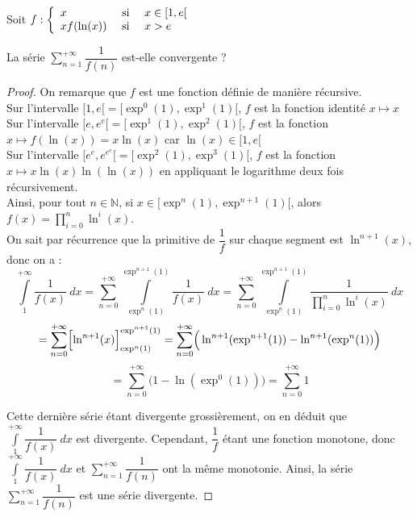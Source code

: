 \begin{exercice}
Soit $f : 
\left\{
\begin{array}{l l l}
x &\text{ si } &x \in [ 1, e [\\
x f(\ln(x)) &\text{ si }& x > e\\
\end{array} 
\right.$

La série $\displaystyle\sum\limits_{n = 1}^{+\infty} \dfrac{1}{f(n)}$ est-elle convergente ?
\end{exercice}

\begin{proof}
On remarque que $f$ est une fonction définie de manière récursive. \\
Sur l'intervalle $[ 1, e [ = [\exp^{0}(1), \exp^{1}(1)[$, $f$ est la fonction identité $x \longmapsto x$\\
Sur l'intervalle $[ e, e^e [ = [\exp^{1}(1), \exp^{2}(1)[$, $f$ est la fonction $x \longmapsto f(\ln(x)) = x \ln(x)$ car $\ln(x) \in [1, e[$\\
Sur l'intervalle $[ e^e, e^{e^e} [ = [\exp^{2}(1), \exp^{3}(1)[$, $f$ est la fonction $x \longmapsto x \ln(x) \ln(\ln(x))$ en appliquant le logarithme deux fois récursivement.\\
Ainsi, pour tout $n \in \mathbb{N}$, si $x \in [\exp^{n}(1), \exp^{n+1}(1)[$, alors $f(x)= \displaystyle\prod\limits_{i = 0}^{n} \ln^{i}(x)$.\\

On sait par récurrence que la primitive de $\dfrac{1}{f}$ sur chaque segment est $\ln^{n+1}(x)$, donc on a :
\[
\displaystyle\int\limits_{1}^{+\infty} \dfrac{1}{f(x)} \: d x 
= \displaystyle\sum\limits_{n = 0}^{+\infty} \displaystyle\int\limits_{\exp^{n}(1)}^{\exp^{n+1}(1)} \dfrac{1}{f(x)} \: d x 
= \displaystyle\sum\limits_{n = 0}^{+\infty} \displaystyle\int\limits_{\exp^{n}(1)}^{\exp^{n+1}(1)} \dfrac{1}{\displaystyle\prod\limits_{i = 0}^{n} \ln^{i}(x)} \: d x 
\]
\[
=\displaystyle\sum\limits_{n = 0}^{+\infty} \Bigl[\ln^{n+1}(x)\Bigr]_{\exp^{n}(1)}^{\exp^{n+1}(1)} 
= \displaystyle\sum\limits_{n = 0}^{+\infty} \Bigr(\ln^{n+1}(\exp^{n+1}(1)) - \ln^{n+1}(\exp^{n}(1))\Bigr)
\]
\[
= \displaystyle\sum\limits_{n = 0}^{+\infty} \Bigr(1 - \ln(\exp^{0}(1))\Bigr) 
= \displaystyle\sum\limits_{n = 0}^{+\infty} 1
\]

Cette dernière série étant divergente grossièrement, on en déduit que $\displaystyle\int\limits_{1}^{+\infty} \dfrac{1}{f(x)} \: d x $ est divergente.
Cependant, $\dfrac{1}{f}$ étant une fonction monotone, donc $\displaystyle\int\limits_{1}^{+\infty} \dfrac{1}{f(x)} \: d x $ et  $\displaystyle\sum\limits_{n = 1}^{+\infty} \dfrac{1}{f(n)}$ ont la même monotonie. Ainsi, la série $\displaystyle\sum\limits_{n = 1}^{+\infty} \dfrac{1}{f(n)}$ est une série divergente.  


\end{proof}
